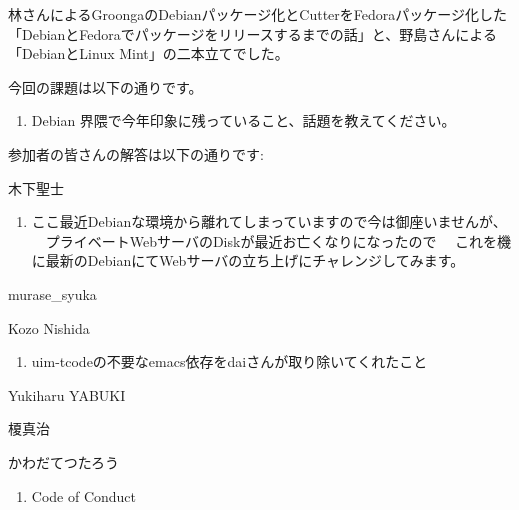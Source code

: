 \documentclass[mingoth,a4paper]{jsarticle}
\begin{document}
林さんによるGroongaのDebianパッケージ化とCutterをFedoraパッケージ化した
「DebianとFedoraでパッケージをリリースするまでの話」と、野島さんによる
「DebianとLinux Mint」の二本立てでした。


今回の課題は以下の通りです。
\begin{screen}
  \begin{enumerate}

  \item %
    Debian 界隈で今年印象に残っていること、話題を教えてください。
    
  \end{enumerate}
\end{screen}

参加者の皆さんの解答は以下の通りです:

\begin{prework}{ 木下聖士 }
  \begin{enumerate}
  \item ここ最近Debianな環境から離れてしまっていますので今は御座いませんが、
    　プライベートWebサーバのDiskが最近お亡くなりになったので
    　これを機に最新のDebianにてWebサーバの立ち上げにチャレンジしてみます。
  \end{enumerate}
\end{prework}

\begin{prework}{ murase\_syuka }
\end{prework}

\begin{prework}{ Kozo Nishida }
  \begin{enumerate}
  \item uim-tcodeの不要なemacs依存をdaiさんが取り除いてくれたこと
  \end{enumerate}
\end{prework}

\begin{prework}{ Yukiharu YABUKI }
\end{prework}

\begin{prework}{ 榎真治 }
\end{prework}

\begin{prework}{ かわだてつたろう }
  \begin{enumerate}
  \item Code of Conduct
  \end{enumerate}
\end{prework}
\end{document}
